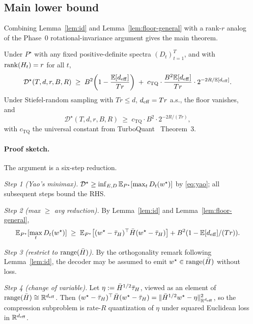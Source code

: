 \subsection{Main lower bound}\label{subsec:main}

Combining Lemma~\ref{lem:id} and Lemma~\ref{lem:floor-general}
with a rank-$r$ analog of the Phase~0 rotational-invariance
argument gives the main theorem.

\begin{theorem}
\label{thm:general}
Under $P^\star$ with any fixed positive-definite spectra
$(D_t)_{t=1}^T$, and with $\operatorname{rank}(H_t) = r$ for all $t$,
\begin{equation}\label{eq:thm-lb}
  \mathcal{D}^\star(T, d, r, B, R)
  \;\geq\;
  B^2\!\left(1 - \frac{\mathbb{E}[d_{\mathrm{eff}}]}{Tr}\right)
  \;+\; c_{\mathrm{TQ}}\cdot\frac{B^2\mathbb{E}[d_{\mathrm{eff}}]}{Tr}
  \cdot 2^{-2R/\mathbb{E}[d_{\mathrm{eff}}]}.
\end{equation}
Under Stiefel-random sampling with $Tr\leq d$, $d_{\mathrm{eff}} = Tr$ a.s.,
the floor vanishes, and
\begin{equation}\label{eq:thm-lb-stiefel}
  \mathcal{D}^\star(T,d,r,B,R)
  \;\geq\;
  c_{\mathrm{TQ}}\cdot B^2 \cdot 2^{-2R/(Tr)},
\end{equation}
with $c_{\mathrm{TQ}}$ the universal constant from
TurboQuant~\cite{zandieh2025turboquant} Theorem~3.
\end{theorem}

\paragraph{Proof sketch.} The argument is a six-step reduction.

\emph{Step 1 (Yao's minimax).} $\mathcal{D}^\star\geq
\inf_{E,D}\mathbb{E}_{P^\star}[\max_t D_t(w^\star)]$ by
\eqref{eq:yao}; all subsequent steps bound the RHS.

\emph{Step 2 (max $\geq$ avg reduction).} By Lemma~\ref{lem:id}
and Lemma~\ref{lem:floor-general},
\begin{equation*}
  \mathbb{E}_{P^\star}[\max_t D_t(w^\star)]
  \;\geq\;
  \mathbb{E}_{P^\star}\bigl[(w^\star-\bar{\tau}_H)^\top\bar H(w^\star-\bar{\tau}_H)\bigr]
  + B^2(1 - \mathbb{E}[d_{\mathrm{eff}}]/(Tr)).
\end{equation*}

\emph{Step 3 (restrict to $\operatorname{range}(\bar H)$).} By the orthogonality
remark following Lemma~\ref{lem:id}, the decoder may be assumed
to emit $w^\star\in\operatorname{range}(\bar H)$ without loss.

\emph{Step 4 (change of variable).} Let $\eta := \bar H^{1/2}
\bar{\tau}_H$, viewed as an element of $\operatorname{range}(\bar H)\cong
\mathbb{R}^{d_{\mathrm{eff}}}$. Then $(w^\star-\bar{\tau}_H)^\top\bar H(w^\star-\bar{\tau}_H) =
\|\bar H^{1/2}w^\star - \eta\|_{\mathbb{R}^{d_{\mathrm{eff}}}}^2$, so the
compression subproblem is rate-$R$ quantization of $\eta$ under
squared Euclidean loss in $\mathbb{R}^{d_{\mathrm{eff}}}$.

